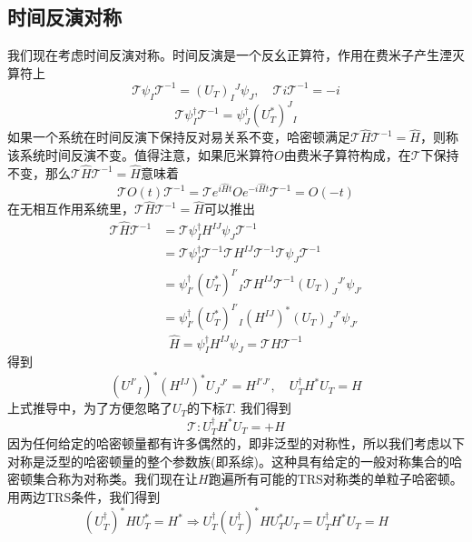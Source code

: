 \documentclass{article}
\numberwithin{equation}{subsection}
\newcommand{\mT}{\mathcal{T}}
\newcommand{\UT}{U_{T}}
\begin{document}
\subsection{时间反演对称}
我们现在考虑时间反演对称。时间反演是一个反幺正算符，作用在费米子产生湮灭算符上
\begin{equation}
    \mT\psi_I\mT^{-1}=(\UT)_I{}^J\psi_J,\quad \mT i\mT^{-1}=-i
\end{equation}
\begin{equation}
    \mT \psi_I^\dagger\mT^{-1}=\psi_J^\dagger(U_T^*)^J{}_{I}
\end{equation}
如果一个系统在时间反演下保持反对易关系不变，哈密顿满足$\mT \hat{H}\mT^{-1}=\hat{H}$，则称该系统时间反演不变。值得注意，如果厄米算符$O$由费米子算符构成，在$\mT$下保持不变，那么$\mT \hat{H}\mT^{-1}=\hat{H}$意味着
\begin{equation}
    \mT O(t)\mT^{-1}=\mT e^{i\hat{H}t}Oe^{-i\hat{H}t}\mT^{-1}=O(-t)
\end{equation}
在无相互作用系统里，$\mT \hat{H}\mT^{-1}=\hat{H}$可以推出
\begin{equation*}
    \begin{split}
        \mT \hat{H}\mT^{-1}&=\mT \psi_I^\dagger H^{IJ}\psi_J\mT^{-1}\\
        &=\mT\psi_I^\dagger\mT^{-1}\mT H^{IJ}\mT^{-1}\mT\psi_J\mT^{-1}\\
        &=\psi_{I'}^\dagger (U_T^*)^{I'}{}_{I}\mT H^{IJ}\mT^{-1}(U_T)_J{}^{J'}\psi_{J'}\\
        &=\psi_{I'}^\dagger(U_T^*)^{I'}{}_I (H^{IJ})^* (U_T)_{J}{}^{J'}\psi_{J'}
    \end{split}
\end{equation*}
\begin{equation}
    \hat{H}=\psi_I^\dagger H^{IJ}\psi_J=\mT H\mT^{-1}
\end{equation}
得到
\begin{equation}
    (U^{I'}{}_I)^*(H^{IJ})^*U_{J}{}^{J'}=H^{I'J'},\quad U_T^\dagger H^*U_T=H
\end{equation}
上式推导中，为了方便忽略了$U_T$的下标$T$. 我们得到
\begin{equation}
    \mT:U_T^\dagger H^* U_T=+H
\end{equation}
因为任何给定的哈密顿量都有许多偶然的，即非泛型的对称性，所以我们考虑以下对称是泛型的哈密顿量的整个参数族(即系综)。这种具有给定的一般对称集合的哈密顿集合称为对称类。我们现在让$H$跑遍所有可能的TRS对称类的单粒子哈密顿。用两边TRS条件，我们得到
\begin{equation}
    (U_T^\dagger)^* HU_T^*=H^*\Rightarrow U_T^\dagger (U_T^\dagger)^* HU_T^* U_T=U_T^\dagger H^* U_T=H
\end{equation}
\end{document}
